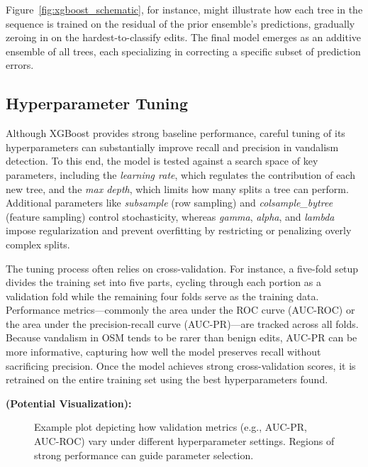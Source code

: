 \documentclass[
    13pt, %
    a4paper, %
    twoside, 
    DIV14, %
    listof=totoc, %
    bibliography=totoc, %
    index=totoc, %
    headsepline
]{scrreprt}
\begin{document}
Figure~\ref{fig:xgboost_schematic}, for instance, might illustrate how each tree in the sequence is trained on the residual of the prior ensemble's predictions, gradually zeroing in on the hardest-to-classify edits. The final model emerges as an additive ensemble of all trees, each specializing in correcting a specific subset of prediction errors.

\subsection{Hyperparameter Tuning}
\label{sec:hyperparameter_tuning}

Although XGBoost provides strong baseline performance, careful tuning of its hyperparameters can substantially improve recall and precision in vandalism detection. To this end, the model is tested against a search space of key parameters, including the \emph{learning rate}, which regulates the contribution of each new tree, and the \emph{max depth}, which limits how many splits a tree can perform. Additional parameters like \emph{subsample} (row sampling) and \emph{colsample\_bytree} (feature sampling) control stochasticity, whereas \emph{gamma}, \emph{alpha}, and \emph{lambda} impose regularization and prevent overfitting by restricting or penalizing overly complex splits.

The tuning process often relies on cross-validation. For instance, a five-fold setup divides the training set into five parts, cycling through each portion as a validation fold while the remaining four folds serve as the training data. Performance metrics—commonly the area under the ROC curve (AUC-ROC) or the area under the precision-recall curve (AUC-PR)—are tracked across all folds. Because vandalism in OSM tends to be rarer than benign edits, AUC-PR can be more informative, capturing how well the model preserves recall without sacrificing precision. Once the model achieves strong cross-validation scores, it is retrained on the entire training set using the best hyperparameters found.

\noindent
\textbf{(Potential Visualization):}  
\begin{figure}[htbp]
    \centering
    \caption{Example plot depicting how validation metrics (e.g., AUC-PR, AUC-ROC) vary under different hyperparameter settings. Regions of strong performance can guide parameter selection.}
    \label{fig:hyperparam_tuning_plot}
\end{figure}
\end{document}

